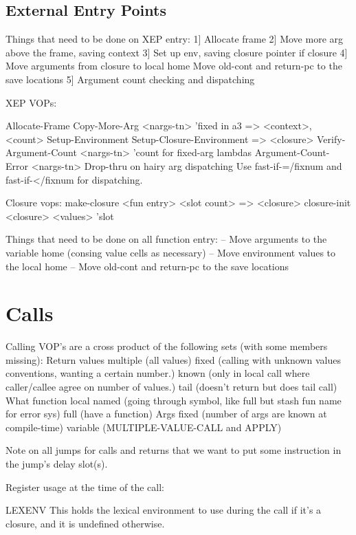 
\subsection{External Entry Points}

Things that need to be done on XEP entry:
 1] Allocate frame
 2] Move more arg above the frame, saving context
 3] Set up env, saving closure pointer if closure
 4] Move arguments from closure to local home
    Move old-cont and return-pc to the save locations
 5] Argument count checking and dispatching

XEP VOPs:

Allocate-Frame
Copy-More-Arg <nargs-tn> 'fixed {in a3} => <context>, <count>
Setup-Environment
Setup-Closure-Environment => <closure>
Verify-Argument-Count <nargs-tn> 'count {for fixed-arg lambdas}
Argument-Count-Error <nargs-tn> {Drop-thru on hairy arg dispatching}
Use fast-if-=/fixnum and fast-if-</fixnum for dispatching.

Closure vops:
make-closure <fun entry> <slot count> => <closure>
closure-init <closure> <values> 'slot


Things that need to be done on all function entry:
 -- Move arguments to the variable home (consing value cells as necessary)
 -- Move environment values to the local home
 -- Move old-cont and return-pc to the save locations


\section{Calls}

Calling VOP's are a cross product of the following sets (with some members
missing):
   Return values
      multiple (all values)
      fixed (calling with unknown values conventions, wanting a certain
             number.)
      known (only in local call where caller/callee agree on number of
      	     values.)
      tail (doesn't return but does tail call)
   What function
      local
      named (going through symbol, like full but stash fun name for error sys)
      full (have a function)
   Args
      fixed (number of args are known at compile-time)
      variable (MULTIPLE-VALUE-CALL and APPLY)

Note on all jumps for calls and returns that we want to put some instruction
in the jump's delay slot(s).

Register usage at the time of the call:

LEXENV
   This holds the lexical environment to use during the call if it's a closure,
   and it is undefined otherwise.

